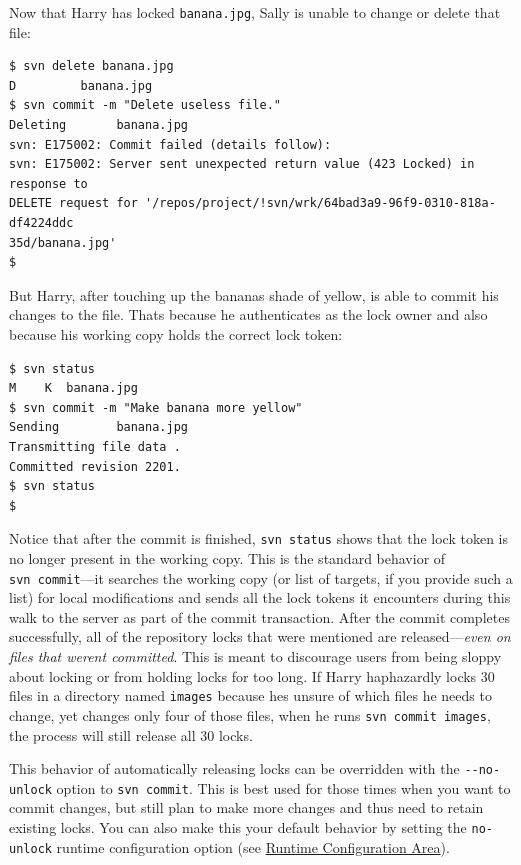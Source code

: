 Now that Harry has locked \texttt{banana.jpg}, Sally is unable to change
or delete that file:

\begin{verbatim}
$ svn delete banana.jpg
D         banana.jpg
$ svn commit -m "Delete useless file."
Deleting       banana.jpg
svn: E175002: Commit failed (details follow):
svn: E175002: Server sent unexpected return value (423 Locked) in response to 
DELETE request for '/repos/project/!svn/wrk/64bad3a9-96f9-0310-818a-df4224ddc
35d/banana.jpg'
$
\end{verbatim}

But Harry, after touching up the banana\textquotesingle s shade of
yellow, is able to commit his changes to the file.
That\textquotesingle s because he authenticates as the lock owner and
also because his working copy holds the correct lock token:

\begin{verbatim}
$ svn status
M    K  banana.jpg
$ svn commit -m "Make banana more yellow"
Sending        banana.jpg
Transmitting file data .
Committed revision 2201.
$ svn status
$
\end{verbatim}

Notice that after the commit is finished, \texttt{svn\ status} shows
that the lock token is no longer present in the working copy. This is
the standard behavior of \texttt{svn\ commit}---it searches the working
copy (or list of targets, if you provide such a list) for local
modifications and sends all the lock tokens it encounters during this
walk to the server as part of the commit transaction. After the commit
completes successfully, all of the repository locks that were mentioned
are released---\emph{even on files that weren\textquotesingle t
committed}. This is meant to discourage users from being sloppy about
locking or from holding locks for too long. If Harry haphazardly locks
30 files in a directory named \texttt{images} because
he\textquotesingle s unsure of which files he needs to change, yet
changes only four of those files, when he runs
\texttt{svn\ commit\ images}, the process will still release all 30
locks.

This behavior of automatically releasing locks can be overridden with
the \texttt{-\/-no-unlock} option to \texttt{svn\ commit}. This is best
used for those times when you want to commit changes, but still plan to
make more changes and thus need to retain existing locks. You can also
make this your default behavior by setting the \texttt{no-unlock}
runtime configuration option (see
\hyperref[svn.advanced.confarea]{Runtime Configuration Area}).

